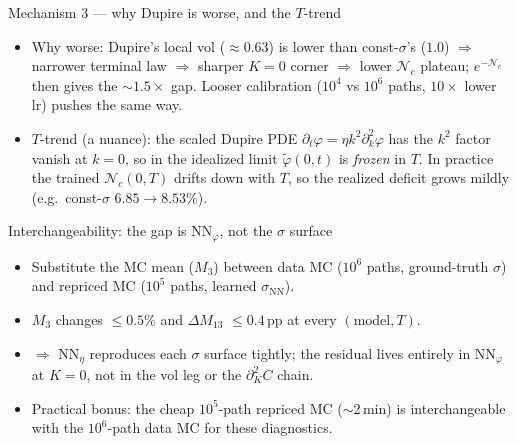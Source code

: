 \documentclass[aspectratio=169,11pt]{beamer}
\newcommand{\gold}[1]{{\color{ntugold}#1}}
\begin{document}
\begin{frame}{Mechanism 3 --- why Dupire is worse, and the $T$-trend}
  \begin{itemize}
    \item \gold{Why worse:} Dupire's local vol ($\approx0.63$) is lower than const-$\sigma$'s ($1.0$)
          $\Rightarrow$ narrower terminal law $\Rightarrow$ sharper $K=0$ corner $\Rightarrow$ lower
          $\mathcal{N}_c$ plateau; $e^{-\mathcal{N}_c}$ then gives the $\sim\!1.5\times$ gap. Looser
          calibration ($10^4$ vs $10^6$ paths, $10\times$ lower lr) pushes the same way.
    \item \gold{$T$-trend (a nuance):} the scaled Dupire PDE $\partial_t\varphi=\eta k^2\partial_k^2\varphi$
          has the $k^2$ factor vanish at $k=0$, so in the idealized limit $\tilde\varphi(0,t)$ is
          \emph{frozen} in $T$. In practice the trained $\mathcal{N}_c(0,T)$ drifts down with $T$, so the
          realized deficit grows mildly (e.g.\ const-$\sigma$ $6.85\!\to\!8.53\%$).
  \end{itemize}
\end{frame}

\begin{frame}{Interchangeability: the gap is $\mathrm{NN}_\varphi$, not the $\sigma$ surface}
  \begin{itemize}
    \item Substitute the MC mean ($M_3$) between \gold{data MC} ($10^6$ paths, ground-truth $\sigma$)
          and \gold{repriced MC} ($10^5$ paths, learned $\sigma_{\mathrm{NN}}$).
    \item $M_3$ changes \gold{$\le0.5\%$} and $\Delta M_{13}$ \gold{$\le0.4$\,pp} at every $(\text{model},T)$.
    \item $\Rightarrow$ $\mathrm{NN}_\eta$ reproduces each $\sigma$ surface tightly; the residual lives
          entirely in $\mathrm{NN}_\varphi$ at $K=0$, not in the vol leg or the $\partial_K^2C$ chain.
    \item Practical bonus: the cheap $10^5$-path repriced MC ($\sim$2\,min) is interchangeable with the
          $10^6$-path data MC for these diagnostics.
  \end{itemize}
\end{frame}
\end{document}
